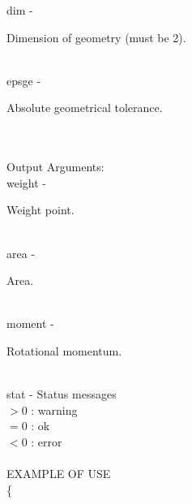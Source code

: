         \>\>    {\fov dim}\> - \>  \begin{minipg2}
                     Dimension of geometry (must be 2).
                               \end{minipg2}\\
        \>\>    {\fov epsge}\> - \>  \begin{minipg2}
                     Absolute geometrical tolerance.
                               \end{minipg2}\\
\\
	\>Output Arguments:\\
        \>\>    {\fov weight}\> - \>  \begin{minipg2}
                     Weight point.
                               \end{minipg2}\\
        \>\>    {\fov area}\> - \>  \begin{minipg2}
                     Area.
                               \end{minipg2}\\
        \>\>    {\fov moment}\> - \>  \begin{minipg2}
                     Rotational momentum.
                               \end{minipg2}\\
        \>\>    {\fov stat}     \> - \> Status messages\\
                \>\>\>\>\>              $> 0$   : warning\\
                \>\>\>\>\>              $= 0$   : ok\\
                \>\>\>\>\>              $< 0$   : error\\
\\
EXAMPLE OF USE\\
		\>      \{ \\

